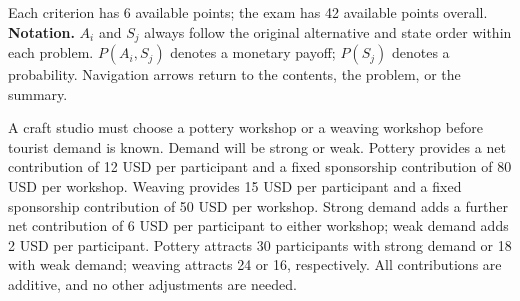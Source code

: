 Each criterion has 6 available points; the exam has 42 available points overall.
\textbf{Notation.} $A_i$ and $S_j$ always follow the original alternative and state order within each problem. $P(A_i,S_j)$ denotes a monetary payoff; $P(S_j)$ denotes a probability. Navigation arrows return to the contents, the problem, or the summary.
\endgroup

\clearpage
{}
A craft studio must choose a pottery workshop or a weaving workshop before tourist demand is known. Demand will be strong or weak. Pottery provides a net contribution of 12 USD per participant and a fixed sponsorship contribution of 80 USD per workshop. Weaving provides 15 USD per participant and a fixed sponsorship contribution of 50 USD per workshop. Strong demand adds a further net contribution of 6 USD per participant to either workshop; weak demand adds 2 USD per participant. Pottery attracts 30 participants with strong demand or 18 with weak demand; weaving attracts 24 or 16, respectively. All contributions are additive, and no other adjustments are needed.
